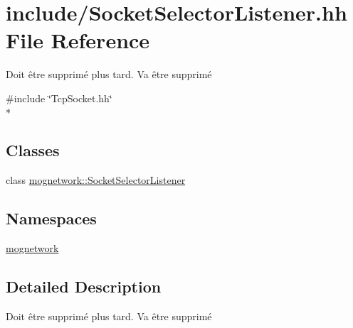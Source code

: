 \hypertarget{_socket_selector_listener_8hh}{\section{include/\-Socket\-Selector\-Listener.hh File Reference}
\label{_socket_selector_listener_8hh}
}


Doit être supprimé plus tard.  Va être supprimé  


{\ttfamily \#include \char`\"{}Tcp\-Socket.\-hh\char`\"{}}\\*
\subsection*{Classes}
\begin{DoxyCompactItemize}
\item 
class \hyperlink{classmognetwork_1_1_socket_selector_listener}{mognetwork\-::\-Socket\-Selector\-Listener}
\end{DoxyCompactItemize}
\subsection*{Namespaces}
\begin{DoxyCompactItemize}
\item 
\hyperlink{namespacemognetwork}{mognetwork}
\end{DoxyCompactItemize}


\subsection{Detailed Description}
Doit être supprimé plus tard.  Va être supprimé 